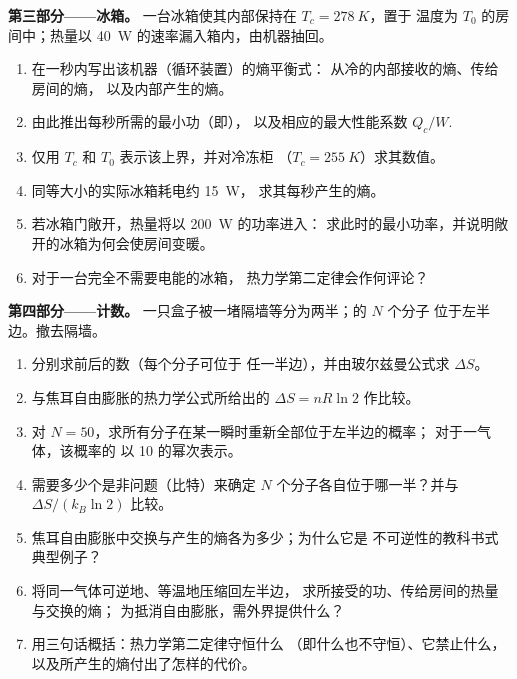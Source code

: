 \begin{problem}
\medskip
\noindent\textbf{第三部分——冰箱。}
一台冰箱使其内部保持在 $T_c = \qty{278}{K}$，置于
温度为 $T_0$ 的房间中；热量以 \qty{40}{W} 的速率漏入箱内，由机器抽回。
\begin{enumerate}[resume]
  \item 在一秒内写出该机器（循环装置）的熵平衡式：
        从冷的内部接收的熵、传给房间的熵，
        以及内部产生的熵。
  \item 由此推出每秒所需的最小功（即），
        以及相应的最大性能系数
        $Q_c/W$.
  \item 仅用 $T_c$ 和 $T_0$ 表示该上界，并对冷冻柜
        （$T_c = \qty{255}{K}$）求其数值。
  \item 同等大小的实际冰箱耗电约 \qty{15}{W}，
        求其每秒产生的熵。
  \item 若冰箱门敞开，热量将以 \qty{200}{W} 的功率进入：
        求此时的最小功率，并说明敞开的冰箱为何会使房间变暖。
  \item 对于一台完全不需要电能的冰箱，
        热力学第二定律会作何评论？
\end{enumerate}

\medskip
\noindent\textbf{第四部分——计数。}
一只盒子被一堵隔墙等分为两半；的 $N$ 个分子
位于左半边。撤去隔墙。
\begin{enumerate}[resume]
  \item 分别求前后的数（每个分子可位于
        任一半边），并由玻尔兹曼公式求 $\Delta S$。
  \item 与焦耳自由膨胀的热力学公式所给出的
        $\Delta S = nR\ln2$ 作比较。
  \item 对 $N = 50$，求所有分子在某一瞬时重新全部位于左半边的概率；
        对于一气体，该概率的
        以 10 的幂次表示。
  \item 需要多少个是非问题（比特）来确定
        $N$ 个分子各自位于哪一半？并与 $\Delta S/(k_B\ln2)$ 比较。
  \item 焦耳自由膨胀中交换与产生的熵各为多少；为什么它是
        不可逆性的教科书式典型例子？
  \item 将同一气体可逆地、等温地压缩回左半边，
        求所接受的功、传给房间的热量与交换的熵；
        为抵消自由膨胀，需外界提供什么？
  \item 用三句话概括：热力学第二定律守恒什么
        （即什么也不守恒）、它禁止什么，以及所产生的熵付出了怎样的代价。
\end{enumerate}
\end{problem}
